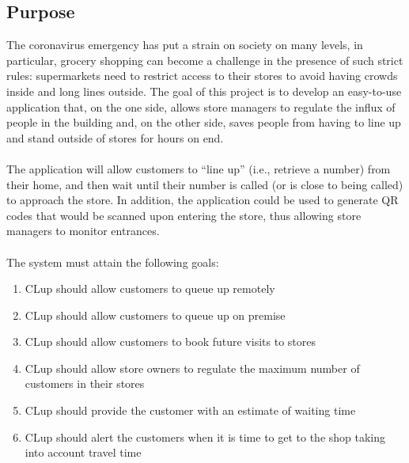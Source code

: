 \subsection{Purpose}
The coronavirus emergency has put a strain on society on many levels, in  particular,  grocery  shopping can  become  a  challenge  in  the presence  of  such  strict  rules: supermarkets  need to  restrict  access  to  their  stores  to  avoid having  crowds  inside and long  lines outside. The  goal  of  this  project  is  to  develop  an  easy-to-use  application  that,  on  the  one  side,  allows  store managers  to  regulate  the  influx  of  people  in  the  building  and,  on  the  other  side,  saves  people  from having to line up and stand outside of stores for hours on end. \\\\
The application will allow customers to “line up” (i.e., retrieve a number) from their home, and then wait  until  their  number  is  called  (or  is  close  to  being  called)  to  approach  the  store.  In  addition,  the application could be used to generate QR codes that would be scanned upon entering the store, thus allowing store managers to monitor entrances.\\\\
The system must attain the following goals:

\begin{enumerate}[label=G\arabic*]
	\item CLup should allow customers to queue up remotely
	\item CLup should allow customers to queue up on premise
	\item CLup should allow customers to book future visits to stores
	\item CLup should allow store owners to regulate the maximum number of customers in their stores
	\item CLup should provide the customer with an estimate of waiting time
	\item CLup should alert the customers when it is time to get to the shop taking into account travel time
\end{enumerate}


